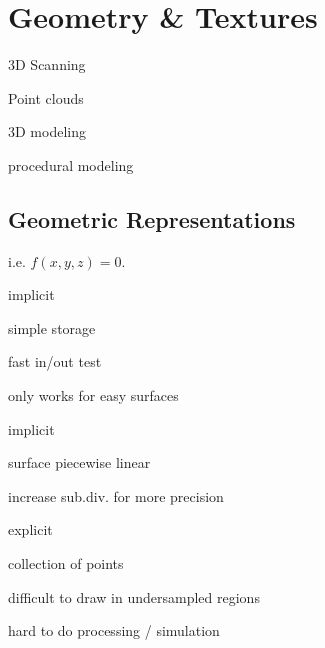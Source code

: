\section{Geometry \& Textures}
\begin{definition}
  \begin{itemize*}
    \item 3D Scanning
    \item Point clouds
    \item 3D modeling
    \item procedural modeling
  \end{itemize*}
\end{definition}

\subsection{Geometric Representations}

\begin{definition}
  i.e. \(f(x, y , z) = 0\).
  \begin{itemize*}
    \item implicit
    \item simple storage
    \item fast in/out test
    \item only works for easy surfaces
  \end{itemize*}
\end{definition}

\begin{definition}
  \begin{itemize*}
    \item implicit
    \item surface piecewise linear
    \item increase sub.div. for more precision
  \end{itemize*}
\end{definition}

\begin{definition}
  \begin{itemize*}
    \item explicit
    \item collection of points
    \item \color{red} difficult to draw in undersampled regions
    \item \color{red} hard to do processing / simulation
  \end{itemize*}
\end{definition}


